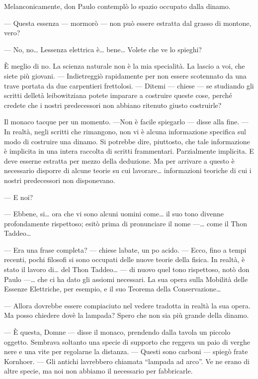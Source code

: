 Melanconicamente, don Paulo contemplò lo spazio occupato dalla dinamo.

--- Questa essenza --- mormorò --- non può essere estratta dal grasso di
montone, vero?

--- No, no\ldots{} L\textquotesingle essenza elettrica è\ldots{}
bene\ldots{} Volete che ve lo spieghi?

È meglio di no. La scienza naturale non è la mia specialità. La lascio a
voi, che siete più giovani. --- Indietreggiò rapidamente per non essere
scotennato da una trave portata da due carpentieri frettolosi. ---
Ditemi --- chiese --- se studiando gli scritti dell\textquotesingle età
leibowitziana potete imparare a costruire queste cose, perché credete
che i nostri predecessori non abbiano ritenuto giusto costruirle?

Il monaco tacque per un momento. ---Non è facile spiegarlo --- disse
alla fine. --- In realtà, negli scritti che rimangono, non vi è alcuna
informazione specifica sul modo di costruire una dinamo. Si potrebbe
dire, piuttosto, che tale informazione è implicita in una intera
raccolta di scritti frammentari. Parzialmente implicita. E deve esserne
estratta per mezzo della deduzione. Ma per arrivare a questo è
necessario disporre di alcune teorie su cui lavorare\ldots{}
informazioni teoriche di cui i nostri predecessori non disponevano.

--- E noi?

--- Ebbene, si\ldots{} ora che vi sono alcuni uomini come\ldots{} il suo
tono divenne profondamente rispettoso; esitò prima di pronunciare il
nome ---\ldots{} come il Thon Taddeo\ldots{}

--- Era una frase completa? --- chiese l\textquotesingle abate, un
po\textquotesingle{} acido. --- Ecco, fino a tempi recenti, pochi
filosofi si sono occupati delle nuove teorie della fisica. In realtà, è
stato il lavoro di\ldots{} del Thon Taddeo\ldots{} --- di nuovo quel
tono rispettoso, notò don Paulo ---\ldots{} che ci ha dato gli assiomi
necessari. La sua opera sulla Mobilità delle Essenze Elettriche, per
esempio, e il suo Teorema della Conservazione\ldots{}

--- Allora dovrebbe essere compiaciuto nel vedere tradotta in realtà la
sua opera. Ma posso chiedere dov\textquotesingle è la lampada? Spero che
non sia più grande della dinamo.

--- È questa, Domne --- disse il monaco, prendendo dalla tavola un
piccolo oggetto. Sembrava soltanto una specie di supporto che reggeva un
paio di verghe nere e una vite per regolarne la distanza. --- Questi
sono carboni --- spiegò frate Kornhoer. --- Gli antichi
l\textquotesingle avrebbero chiamata ``lampada ad arco''. Ve ne erano di
altre specie, ma noi non abbiamo il necessario per fabbricarle.

